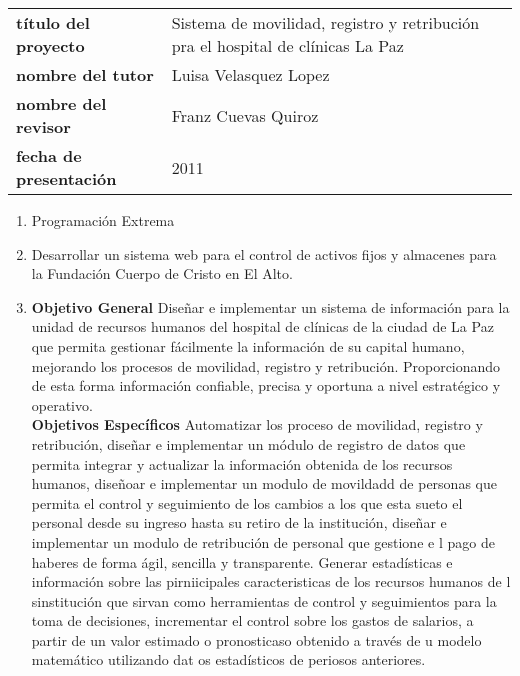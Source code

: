 \begin{tabular}{p{}p{}}
\textbf{título del proyecto} & Sistema de movilidad, registro y retribución pra el hospital de clínicas La Paz \\
\textbf{nombre del tutor} & Luisa Velasquez Lopez \\
\textbf{nombre del revisor} & Franz Cuevas Quiroz \\
\textbf{fecha de presentación} & 2011
\end{tabular}

\begin{enumerate}[a]
\item Programación Extrema
\item Desarrollar un sistema web para el control de activos fijos y almacenes para la Fundación Cuerpo de Cristo en El Alto.
\item \textbf{Objetivo General} Diseñar e implementar un sistema de información para la unidad de recursos humanos del hospital de clínicas de la ciudad de La Paz que permita gestionar fácilmente la información de su capital humano, mejorando los procesos de movilidad, registro y retribución. Proporcionando de esta forma información confiable, precisa y oportuna a nivel estratégico y operativo. \\
\textbf{Objetivos Específicos} Automatizar los proceso de movilidad, registro y retribución, diseñar e implementar un módulo de registro de datos que permita integrar y actualizar la información obtenida de los recursos humanos, diseñoar e implementar un modulo de movildadd de personas que permita el control y seguimiento de los cambios a los que esta sueto el personal desde su ingreso hasta su retiro de la institución, diseñar e implementar un modulo de retribución de personal que gestione e l pago de haberes de forma ágil, sencilla y transparente. Generar estadísticas e información sobre las pirniicipales caracteristicas de los recursos humanos de l sinstitución que sirvan como herramientas de control y seguimientos para la toma de decisiones, incrementar el control sobre los gastos de salarios, a partir de un valor estimado o pronosticaso obtenido a través de u modelo matemático utilizando dat os estadísticos de periosos anteriores.


\end{enumerate}

